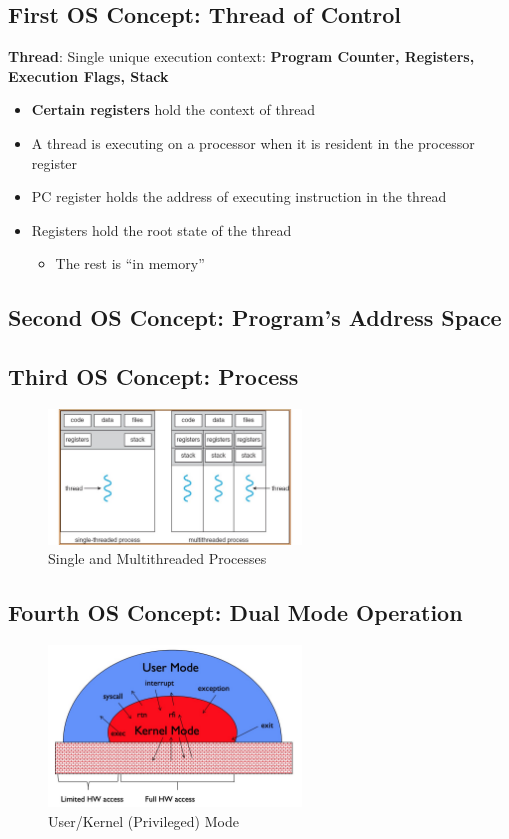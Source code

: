 \subsection{First OS Concept: Thread of Control}
\textbf{Thread}: Single unique execution context: \textbf{Program Counter, Registers, Execution Flags, Stack}
\begin{itemize}
    \item \textbf{Certain registers} hold the context of thread
    \item A thread is executing on a processor when it is resident in the processor register
    \item PC register holds the address of executing instruction in the thread
    \item Registers hold the root state of the thread
    \begin{itemize}
        \item The rest is ``in memory''
    \end{itemize}
\end{itemize}


\subsection{Second OS Concept: Program's Address Space}

\subsection{Third OS Concept: Process}
\begin{figure}[H]
    \centering
    \includegraphics[width = 0.6\textwidth ]{figures/process.jpg}
    \caption{Single and Multithreaded Processes}
\end{figure}


\subsection{Fourth OS Concept: Dual Mode Operation}
\begin{figure}[H]
    \centering
    \includegraphics[width = 0.6\textwidth ]{figures/dual_mode.jpg}
    \caption{User/Kernel (Privileged) Mode}
\end{figure}
